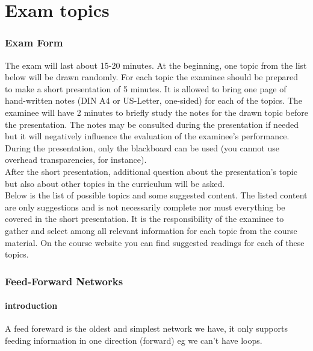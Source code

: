 \documentclass[a4paper,10pt,titlepage]{report}
\begin{document}
\part{Exam topics}

\section{Exam Form}

The exam will last about 15-20 minutes. At the beginning, one topic from the list below will be drawn randomly. For each topic the examinee should be prepared to make a short presentation of 5 minutes. It is allowed to bring one page of hand-written notes (DIN A4 or US-Letter, one-sided) for each of the topics. The examinee will have 2 minutes to briefly study the notes for the drawn topic before the presentation. The notes may be consulted during the presentation if needed but it will negatively influence the evaluation of the examinee's performance. During the presentation, only the blackboard can be used (you cannot use overhead transparencies, for instance).
\\
\vspace{10mm}
After the short presentation, additional question about the presentation's topic but also about other topics in the curriculum will be asked.
\\
\vspace{10mm}
Below is the list of possible topics and some suggested content. The listed content are only suggestions and is not necessarily complete nor must everything be covered in the short presentation. It is the responsibility of the examinee to gather and select among all relevant information for each topic from the course material. On the course website you can find suggested readings for each of these topics.\\







\newpage
\section{Feed-Forward Networks}

\subsection{introduction}
A feed foreward is the oldest and simplest network we have, it only supports feeding information in one direction (forward) eg we can't have loops.
\end{document}
